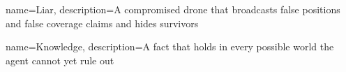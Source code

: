 {
    name=Liar,
    description={A compromised drone that broadcasts false positions and false coverage claims and hides survivors}
}

{
    name=Knowledge,
    description={A fact that holds in every possible world the agent cannot yet rule out}
}
